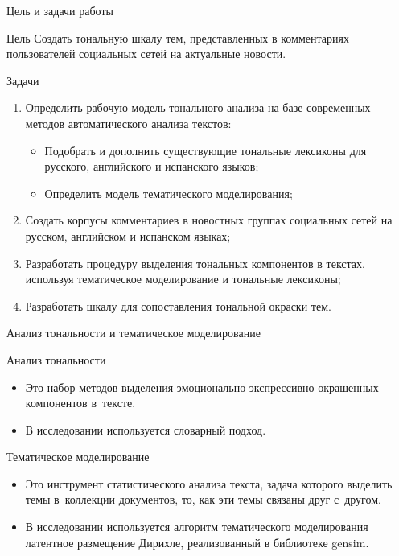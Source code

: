 \documentclass[xetex, aspectratio = 169]{beamer}
\begin{document}
\begin{frame}{Цель и задачи работы}
    \begin{block}{Цель}
        Создать тональную шкалу тем, представленных в комментариях пользователей социальных сетей на актуальные новости.
    \end{block}

    \begin{block}{Задачи}
        \begin{enumerate}
            \item Определить рабочую модель тонального анализа на базе современных методов автоматического анализа текстов:
            \begin{itemize}
                \item Подобрать и дополнить существующие тональные лексиконы для русского, английского и испанского языков;
                \item Определить модель тематического моделирования;
            \end{itemize}
            \item Создать корпусы комментариев в новостных группах социальных сетей на русском, английском и испанском языках;
            \item Разработать процедуру выделения тональных компонентов в текстах, используя тематическое моделирование и тональные лексиконы;
            \item Разработать шкалу для сопоставления тональной окраски тем.
        \end{enumerate}
    \end{block}
\end{frame}

\begin{frame}{Анализ тональности и тематическое моделирование}
    \begin{block}{Анализ тональности}
        \begin{itemize}
            \item Это набор методов выделения эмоционально-экспрессивно окрашенных компонентов в~тексте.
            \item В исследовании используется словарный подход.
        \end{itemize}
    \end{block}

    \begin{block}{Тематическое моделирование}
        \begin{itemize}
            \item Это инструмент статистического анализа текста, задача которого выделить темы в~коллекции документов, то, как эти темы связаны друг с~другом.
            \item В исследовании используется алгоритм тематического моделирования латентное размещение Дирихле, реализованный в библиотеке gensim.
        \end{itemize}
    \end{block}
\end{frame}
\end{document}
